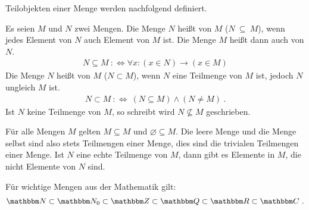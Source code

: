 \begin{Unit}
Teilobjekten einer Menge werden nachfolgend definiert.

\begin{Definition}
  Es seien $M$ und $N$ zwei Mengen. Die Menge $N$ heißt  
  von $M$ ($N\ \subseteq\ M$), wenn jedes Element von $N$ auch Element von 
  $M$ ist. Die Menge $M$ heißt dann auch  von $N$.
  \begin{align}
    N \subseteq M\ :\Leftrightarrow \forall x : (x \in N) \rightarrow 
    (x \in M)
  \end{align}
  Die Menge $N$ heißt  von 
  $M$ ($N \subset M$), wenn $N$ eine Teilmenge von $M$ ist, jedoch $N$ 
  ungleich $M$ ist.
  \begin{align}
    N \subset M\ :\Leftrightarrow\ (N \subseteq M) \wedge (N \not= M)\ .
  \end{align}
  Ist $N$ keine Teilmenge von $M$, so schreibt wird $N \not\subseteq M$
  geschrieben.
\end{Definition}

Für alle Mengen $M$ gelten $M \subseteq M$ und $\varnothing \subseteq M$. Die 
leere Menge und die Menge selbst sind also stets Teilmengen einer Menge, dies 
sind die trivialen Teilmengen einer Menge. Ist $N$ eine echte Teilmenge von 
$M$, dann gibt es Elemente in $M$, die nicht Elemente von $N$ sind.

Für wichtige Mengen aus der Mathematik gilt: 
\begin{align}
  \NN \subset \NN_0 \subset \ZZ \subset \QQ \subset \RR \subset \CC \ .
\end{align}
\end{Unit}

